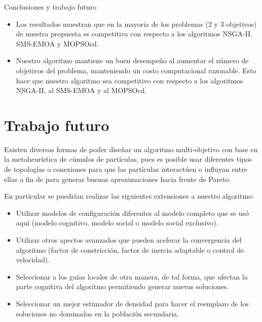 \begin{chapter}{Conclusiones y trabajo futuro}
\begin{itemize}
  \item Los resultados muestran que en la mayoria de los problemas (2 y 3 objetivos) de nuestra propuesta es competitiva
  con respecto a los algoritmos NSGA-II, SMS-EMOA y MOPSOcd.
  
  \item Nuestro algoritmo mantiene un buen desempe\~no al aumentar el n\'umero de objetivos del problema, manteniendo un costo computacional 
  razonable. Esto hace que nuestro algoritmo sea competitivo con respecto a los algoritmos NSGA-II, al SMS-EMOA y al MOPSOcd.
  \end{itemize}
  
  \section{Trabajo futuro}
  
  Existen diversas formas de poder dise\~nar un algoritmo multi-objetivo con base en la metaheur\'istica de c\'umulos de 
  part\'iculas, pues es posible usar diferentes tipos de topolog\'ias o conexiones para que las part\'iculas interact\'uen o 
  influyan entre ellas a fin de para generar buenas aproximaciones hacia frente de Pareto.
 
  En particular se puedr\'ian realizar las siguientes extensiones a nuestro algoritmo:
  
  \begin{itemize}
  \item Utilizar modelos de configuraci\'on diferentes al modelo completo que se us\'o aqu\'i 
   (modelo cognitivo, modelo social o modelo social exclusivo). 
  \item Utilizar otros apectos avanzados que pueden acelerar la convergencia del algoritmo (factor de constricci\'on, factor de inercia 
  adaptable o control de velocidad).
  
 \item Seleccionar a los gu\'ias locales de otra manera, de tal forma, que afectan la parte cognitiva del algoritmo permitiendo
 generar nuevas soluciones.
 
 \item Seleccionar un mejor estimador de densidad para hacer el reemplazo de los soluciones no dominadas en la poblaci\'on secundaria.
 
 \end{itemize}  
\end{chapter}